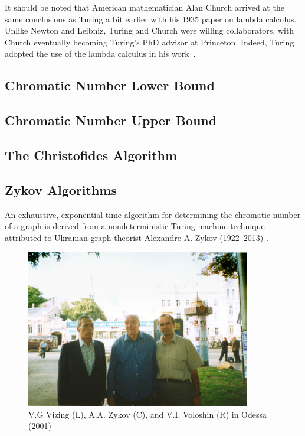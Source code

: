 It should be noted that American mathematician Alan Church arrived at the same conclusions as Turing a bit earlier
with his 1935 paper on lambda calculus.  Unlike Newton and Leibniz, Turing and Church were willing collaborators,
with Church eventually becoming Turing's PhD advisor at Princeton.  Indeed, Turing adopted the use of the lambda
calculus in his work~\cite{dturing}.

\subsection{Chromatic Number Lower Bound}\label{sec:sub:lower}

\subsection{Chromatic Number Upper Bound}\label{sec:sub:upper}

\subsection{The Christofides Algorithm}\label{sec:christofides}

\subsection{Zykov Algorithms}\label{sec:zykov}

An exhaustive, exponential-time algorithm for determining the chromatic number of a graph is derived from a
nondeterministic Turing machine technique attributed to Ukranian graph theorist Alexandre A. Zykov (1922--2013)
\cite{obit}.

\begin{figure}[h]
  \label{fig:zykov}
  \begin{center}
    \includegraphics{zykov}
  \end{center}
  \caption{V.G Vizing (L), A.A. Zykov (C), and V.I. Voloshin (R) in Odessa (2001) \cite{voloshin}}
\end{figure}

